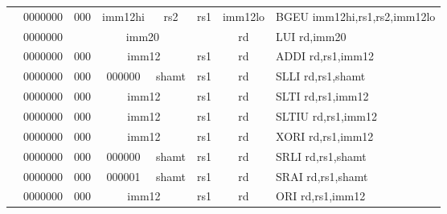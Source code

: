 \begin{table}[p]
\begin{small}
\begin{center}
\begin{tabular}{rcccccccccl}
&
\multicolumn{1}{|c|}{0000000} &
\multicolumn{2}{c|}{000} &
\multicolumn{3}{c|}{imm12hi} &
\multicolumn{1}{c|}{rs2} &
\multicolumn{1}{c|}{rs1} &
\multicolumn{1}{c|}{imm12lo} & BGEU imm12hi,rs1,rs2,imm12lo \\
\cline{2-10}
  

&
\multicolumn{1}{|c|}{0000000} &
\multicolumn{7}{c|}{imm20} &
\multicolumn{1}{c|}{rd} & LUI rd,imm20 \\
\cline{2-10}
  

&
\multicolumn{1}{|c|}{0000000} &
\multicolumn{2}{c|}{000} &
\multicolumn{4}{c|}{imm12} &
\multicolumn{1}{c|}{rs1} &
\multicolumn{1}{c|}{rd} & ADDI rd,rs1,imm12 \\
\cline{2-10}
  

&
\multicolumn{1}{|c|}{0000000} &
\multicolumn{2}{c|}{000} &
\multicolumn{2}{c|}{000000} &
\multicolumn{2}{c|}{shamt} &
\multicolumn{1}{c|}{rs1} &
\multicolumn{1}{c|}{rd} & SLLI rd,rs1,shamt \\
\cline{2-10}
  

&
\multicolumn{1}{|c|}{0000000} &
\multicolumn{2}{c|}{000} &
\multicolumn{4}{c|}{imm12} &
\multicolumn{1}{c|}{rs1} &
\multicolumn{1}{c|}{rd} & SLTI rd,rs1,imm12 \\
\cline{2-10}
  

&
\multicolumn{1}{|c|}{0000000} &
\multicolumn{2}{c|}{000} &
\multicolumn{4}{c|}{imm12} &
\multicolumn{1}{c|}{rs1} &
\multicolumn{1}{c|}{rd} & SLTIU rd,rs1,imm12 \\
\cline{2-10}
  

&
\multicolumn{1}{|c|}{0000000} &
\multicolumn{2}{c|}{000} &
\multicolumn{4}{c|}{imm12} &
\multicolumn{1}{c|}{rs1} &
\multicolumn{1}{c|}{rd} & XORI rd,rs1,imm12 \\
\cline{2-10}
  

&
\multicolumn{1}{|c|}{0000000} &
\multicolumn{2}{c|}{000} &
\multicolumn{2}{c|}{000000} &
\multicolumn{2}{c|}{shamt} &
\multicolumn{1}{c|}{rs1} &
\multicolumn{1}{c|}{rd} & SRLI rd,rs1,shamt \\
\cline{2-10}
  

&
\multicolumn{1}{|c|}{0000000} &
\multicolumn{2}{c|}{000} &
\multicolumn{2}{c|}{000001} &
\multicolumn{2}{c|}{shamt} &
\multicolumn{1}{c|}{rs1} &
\multicolumn{1}{c|}{rd} & SRAI rd,rs1,shamt \\
\cline{2-10}
  

&
\multicolumn{1}{|c|}{0000000} &
\multicolumn{2}{c|}{000} &
\multicolumn{4}{c|}{imm12} &
\multicolumn{1}{c|}{rs1} &
\multicolumn{1}{c|}{rd} & ORI rd,rs1,imm12 \\
\cline{2-10}
  


\end{tabular}
\end{center}
\end{small}
\end{table}
